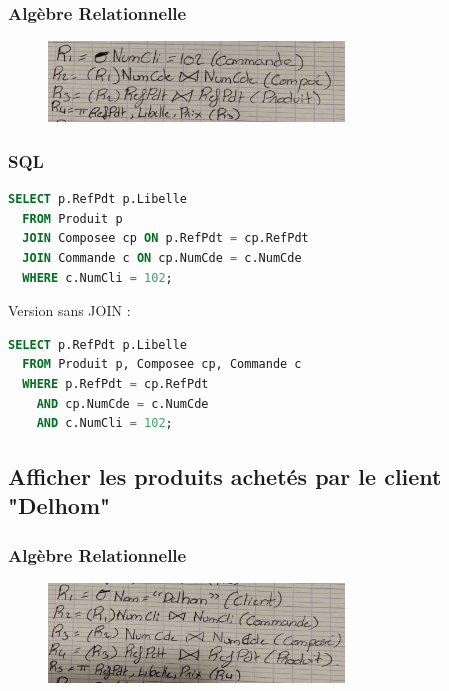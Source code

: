 \documentclass{article}
\begin{document}
\subsubsection{Algèbre Relationnelle}

\begin{figure}[H]
  \centering
  \includegraphics[width=0.7\textwidth]{alg/5.png}
  \label{fig:alg-rel}
\end{figure}

\subsubsection{SQL}

\begin{lstlisting}[language=SQL]
  SELECT p.RefPdt p.Libelle 
  FROM Produit p
  JOIN Composee cp ON p.RefPdt = cp.RefPdt
  JOIN Commande c ON cp.NumCde = c.NumCde
  WHERE c.NumCli = 102;
\end{lstlisting}

Version sans JOIN :

\begin{lstlisting}[language=SQL]
  SELECT p.RefPdt p.Libelle 
  FROM Produit p, Composee cp, Commande c
  WHERE p.RefPdt = cp.RefPdt 
    AND cp.NumCde = c.NumCde 
    AND c.NumCli = 102;
\end{lstlisting}

\subsection{Afficher les produits achetés par le client "Delhom"}

\subsubsection{Algèbre Relationnelle}

\begin{figure}[H]
  \centering
  \includegraphics[width=0.7\textwidth]{alg/6.png}
  \label{fig:alg-rel}
\end{figure}
\end{document}
